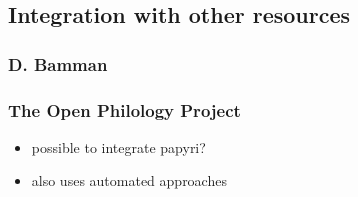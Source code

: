 
\subsection{Integration with other resources}
\label{sec:linking}

\subsubsection{D. Bamman}
\cite{bammanpbml2008,bammantlt8,bammancrane2011}

\subsubsection{The Open Philology Project}
\begin{itemize}
\item possible to integrate papyri?
\item also uses automated approaches
\end{itemize}

